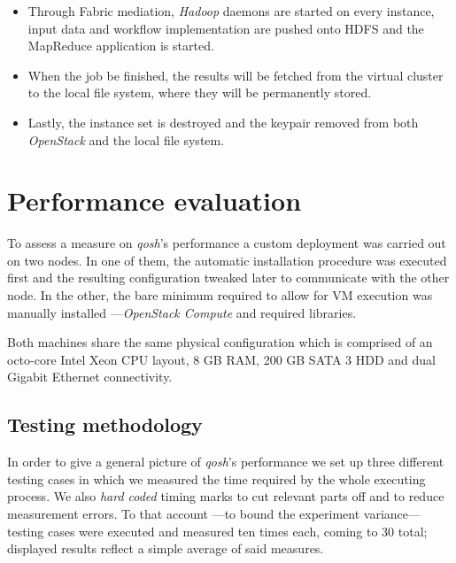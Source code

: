 \documentclass{sig-alternate}
\begin{document}
\begin{itemize}
 \item Through Fabric mediation, \emph{Hadoop} daemons are started on every instance, input data and workflow implementation are pushed onto HDFS and the MapReduce application is started.
 
 \item When the job be finished, the results will be fetched from the virtual cluster to the local file system, where they will be permanently stored.
 
 \item Lastly, the instance set is destroyed and the keypair removed from both \emph{OpenStack} and the local file system.
\end{itemize}


\section{Performance evaluation}\label{sec:performance}
\noindent To assess a measure on \emph{qosh}'s performance a custom deployment was carried out on two nodes. In one of them, the automatic installation procedure was executed first and the resulting configuration tweaked later to communicate with the other node. In the other, the bare minimum required to allow for VM execution was manually installed ---\emph{OpenStack Compute} and required libraries.

Both machines share the same physical configuration which is comprised of an octo-core Intel Xeon CPU layout, 8 GB RAM, 200 GB SATA 3 HDD and dual Gigabit Ethernet connectivity.

\subsection{Testing methodology}\label{subsec:methodology}
\noindent In order to give a general picture of \emph{qosh}'s performance we set up three different testing cases in which we measured the time required by the whole executing process. We also \emph{hard coded} timing marks to cut relevant parts off and to reduce measurement errors. To that account ---to bound the experiment variance--- testing cases were executed and measured ten times each, coming to 30 total; displayed results reflect a simple average of said measures.
\end{document}
